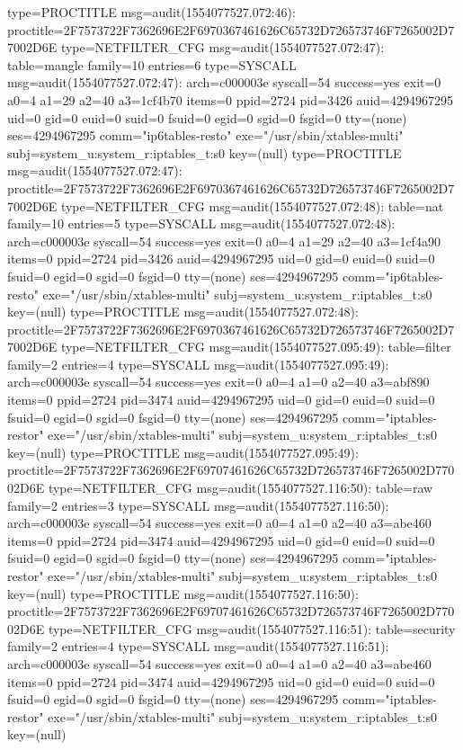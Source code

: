\documentclass[]{report}
\newenvironment{Shaded}{}{}
\newcommand{\NormalTok}[1]{#1}
\begin{document}
\begin{Shaded}
\begin{Highlighting}[]
\NormalTok{type=PROCTITLE msg=audit(1554077527.072:46): proctitle=2F7573722F7362696E2F6970367461626C65732D726573746F7265002D77002D6E}
\NormalTok{type=NETFILTER_CFG msg=audit(1554077527.072:47): table=mangle family=10 entries=6}
\NormalTok{type=SYSCALL msg=audit(1554077527.072:47): arch=c000003e syscall=54 success=yes exit=0 a0=4 a1=29 a2=40 a3=1cf4b70 items=0 ppid=2724 pid=3426 auid=4294967295 uid=0 gid=0 euid=0 suid=0 fsuid=0 egid=0 sgid=0 fsgid=0 tty=(none) ses=4294967295 comm="ip6tables-resto" exe="/usr/sbin/xtables-multi" subj=system_u:system_r:iptables_t:s0 key=(null)}
\NormalTok{type=PROCTITLE msg=audit(1554077527.072:47): proctitle=2F7573722F7362696E2F6970367461626C65732D726573746F7265002D77002D6E}
\NormalTok{type=NETFILTER_CFG msg=audit(1554077527.072:48): table=nat family=10 entries=5}
\NormalTok{type=SYSCALL msg=audit(1554077527.072:48): arch=c000003e syscall=54 success=yes exit=0 a0=4 a1=29 a2=40 a3=1cf4a90 items=0 ppid=2724 pid=3426 auid=4294967295 uid=0 gid=0 euid=0 suid=0 fsuid=0 egid=0 sgid=0 fsgid=0 tty=(none) ses=4294967295 comm="ip6tables-resto" exe="/usr/sbin/xtables-multi" subj=system_u:system_r:iptables_t:s0 key=(null)}
\NormalTok{type=PROCTITLE msg=audit(1554077527.072:48): proctitle=2F7573722F7362696E2F6970367461626C65732D726573746F7265002D77002D6E}
\NormalTok{type=NETFILTER_CFG msg=audit(1554077527.095:49): table=filter family=2 entries=4}
\NormalTok{type=SYSCALL msg=audit(1554077527.095:49): arch=c000003e syscall=54 success=yes exit=0 a0=4 a1=0 a2=40 a3=abf890 items=0 ppid=2724 pid=3474 auid=4294967295 uid=0 gid=0 euid=0 suid=0 fsuid=0 egid=0 sgid=0 fsgid=0 tty=(none) ses=4294967295 comm="iptables-restor" exe="/usr/sbin/xtables-multi" subj=system_u:system_r:iptables_t:s0 key=(null)}
\NormalTok{type=PROCTITLE msg=audit(1554077527.095:49): proctitle=2F7573722F7362696E2F69707461626C65732D726573746F7265002D77002D6E}
\NormalTok{type=NETFILTER_CFG msg=audit(1554077527.116:50): table=raw family=2 entries=3}
\NormalTok{type=SYSCALL msg=audit(1554077527.116:50): arch=c000003e syscall=54 success=yes exit=0 a0=4 a1=0 a2=40 a3=abe460 items=0 ppid=2724 pid=3474 auid=4294967295 uid=0 gid=0 euid=0 suid=0 fsuid=0 egid=0 sgid=0 fsgid=0 tty=(none) ses=4294967295 comm="iptables-restor" exe="/usr/sbin/xtables-multi" subj=system_u:system_r:iptables_t:s0 key=(null)}
\NormalTok{type=PROCTITLE msg=audit(1554077527.116:50): proctitle=2F7573722F7362696E2F69707461626C65732D726573746F7265002D77002D6E}
\NormalTok{type=NETFILTER_CFG msg=audit(1554077527.116:51): table=security family=2 entries=4}
\NormalTok{type=SYSCALL msg=audit(1554077527.116:51): arch=c000003e syscall=54 success=yes exit=0 a0=4 a1=0 a2=40 a3=abe460 items=0 ppid=2724 pid=3474 auid=4294967295 uid=0 gid=0 euid=0 suid=0 fsuid=0 egid=0 sgid=0 fsgid=0 tty=(none) ses=4294967295 comm="iptables-restor" exe="/usr/sbin/xtables-multi" subj=system_u:system_r:iptables_t:s0 key=(null)}

\end{Highlighting}
\end{Shaded}
\end{document}
